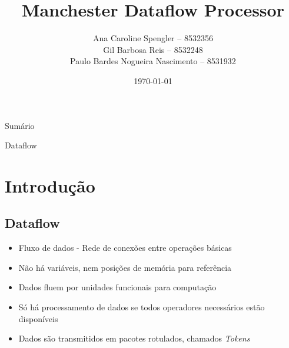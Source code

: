 \documentclass{beamer}
\title{Manchester Dataflow Processor}
\author[Ana C. Spengler, Gil B. Reis, Paulo B. N. Nascimento]
		{Ana Caroline Spengler -- 8532356 \\
        Gil Barbosa Reis -- 8532248 \\
        Paulo Bardes Nogueira Nascimento -- 8531932}
\institute{ICMC - USP São Carlos}
\date{\today}
\begin{document}
\begin{frame}
	\titlepage
\end{frame}

\begin{frame}{Sumário}
	\tableofcontents
\end{frame}

\begin{frame}{Dataflow}
	\section{Introdução}
	\subsection{Dataflow}
	
	\begin{itemize}
		\item Fluxo de dados - Rede de conexões entre operações básicas
		\item Não há variáveis, nem posições de memória para referência
		\item Dados fluem por unidades funcionais para computação
		\item Só há processamento de dados se todos operadores necessários estão disponíveis
		\item Dados são transmitidos em pacotes rotulados, chamados {\em Tokens}
	\end{itemize}
\end{frame}
\end{document}
